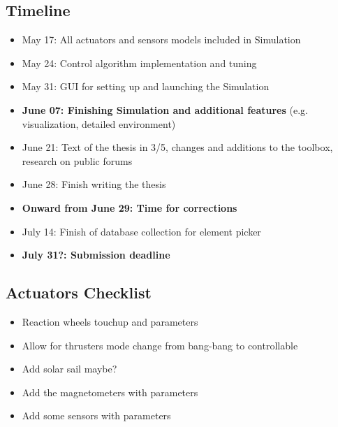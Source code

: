 \subsection*{Timeline}
\begin{itemize}
    \item May 17: All actuators and sensors models included in Simulation
    \item May 24: Control algorithm implementation and tuning
    \item May 31: GUI for setting up and launching the Simulation
    \item \textbf{June 07: Finishing Simulation and additional features} (e.g. visualization, detailed environment)
    \item June 21: Text of the thesis in 3/5, changes and additions to the toolbox, research on public forums
    \item June 28: Finish writing the thesis
    \item \textbf{Onward from June 29: Time for corrections}
    \item July 14: Finish of database collection for element picker
    \item \textbf{July 31?: Submission deadline}
\end{itemize}


\subsection*{Actuators Checklist}
\begin{itemize}
    \item Reaction wheels touchup and parameters
    \item Allow for thrusters mode change from bang-bang to controllable
    \item Add solar sail maybe?
    \item Add the magnetometers with parameters
    \item Add some sensors with parameters
\end{itemize}

